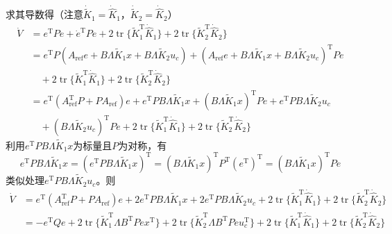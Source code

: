 求其导数得（注意$\dot{\tilde{K}}_1=\dot{\hat{K}}_1$，$\dot{\tilde{K}}_2=\dot{\hat{K}}_2$）
\begin{align*}
  \dot{V} & =e^\mathrm{T}P\dot{e}+\dot{e}^\mathrm{T}Pe + 2\ensuremath{\operatorname{tr}} \{
  \tilde{K}^\mathrm{T}_1 \dot{\hat{K}} _1 \} + 2\ensuremath{\operatorname{tr}}
  \{ \tilde{K}^\mathrm{T}_2 \dot{\hat{K}} _2 \}\\
  & = e^\mathrm{T}P( A_{\ensuremath{\operatorname{ref}}} e + B \Lambda  \tilde{K}_1 x +
  B \Lambda  \tilde{K}_2 u_c)+(A_{\ensuremath{\operatorname{ref}}} e + B \Lambda  \tilde{K}_1 x +
  B \Lambda  \tilde{K}_2 u_c)^\mathrm{T}Pe\\
  &\quad+
  2\ensuremath{\operatorname{tr}} \{ \tilde{K}^\mathrm{T}_1 \dot{\hat{K}} _1 \}
  + 2\ensuremath{\operatorname{tr}} \{ \tilde{K}^\mathrm{T}_2 \dot{\hat{K}} _2 \}\\
  & = e^\mathrm{T}(A_{\ensuremath{\operatorname{ref}}}^\mathrm{T} P + P A_{\ensuremath{\operatorname{ref}}}) e+{e}^\mathrm{T}PB\Lambda\tilde{K}_1x+(B\Lambda \tilde{K}_1x)^\mathrm{T}Pe+{e}^\mathrm{T}PB\Lambda
  \tilde{K}_2u_c\\
  &\quad +(B\Lambda \tilde{K}_2u_c)^\mathrm{T}Pe+
  2\ensuremath{\operatorname{tr}} \{ \tilde{K}^\mathrm{T}_1 \dot{\hat{K}} _1 \}
  + 2\ensuremath{\operatorname{tr}} \{ \tilde{K}^\mathrm{T}_2 \dot{\hat{K}} _2 \}
\end{align*}
利用${e}^\mathrm{T}PB\Lambda\tilde{K}_1x$为标量且$P$为对称，有
\[{e}^\mathrm{T}PB\Lambda\tilde{K}_1x=({e}^\mathrm{T}PB\Lambda\tilde{K}_1x)^\mathrm{T}=(B\Lambda\tilde{K}_1x)^\mathrm{T}P^\mathrm{T}(e^\mathrm{T})^\mathrm{T}=(B\Lambda\tilde{K}_1x)^\mathrm{T}Pe\]
类似处理${e}^\mathrm{T}PB\Lambda\tilde{K}_2u_c$。则
\begin{align}
 \dot{V} & = e^\mathrm{T}(A_{\ensuremath{\operatorname{ref}}}^\mathrm{T} P + P A_{\ensuremath{\operatorname{ref}}}) e+ 2 e^\mathrm{T}  P  B \Lambda 
  \tilde{K}_1 x + 2 e^\mathrm{T} P  B \Lambda  \tilde{K}_2 u_c +
  2\ensuremath{\operatorname{tr}} \{ \tilde{K}^\mathrm{T}_1  \dot{\hat{K}} _1 \}
  + 2\ensuremath{\operatorname{tr}} \{ \tilde{K}^\mathrm{T}_2  \dot{\hat{K}} _2
  \}\nonumber\\
  & = -e^\mathrm{T}Q e +
  2\ensuremath{\operatorname{tr}} \{ \tilde{K}^\mathrm{T}_1 \Lambda B^\mathrm{T}  P  e  x^\mathrm{T} \} +
  2\ensuremath{\operatorname{tr}} \{ \tilde{K}^\mathrm{T}_2 \Lambda B^\mathrm{T}  P  e  u_c^\mathrm{T} \} +
  2\ensuremath{\operatorname{tr}} \{ \tilde{K}^\mathrm{T}_1  \dot{\hat{K}} _1 \}
  + 2\ensuremath{\operatorname{tr}} \{ \tilde{K}^\mathrm{T}_2  \dot{\hat{K}} _2
  \}\label{dot_V_modify1}
\end{align}
